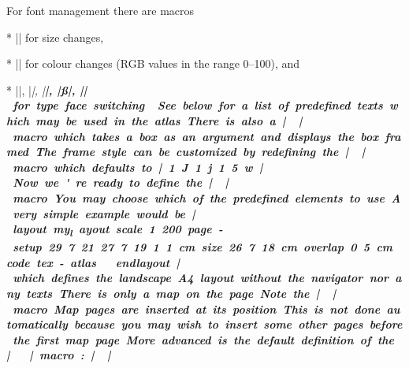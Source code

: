 For font management there are macros 

\list
* |\size[#1]| for size changes,

* |\color[#1 #2 #3]| for colour changes (RGB values in the range 0--100), and

* |\rm|, |\it|, |\bf|, |\ss|, |\si| for type face switching.
\endlist


See below for a list of predefined texts which may be used in the atlas.

There is also a |\framed| macro which takes a box as an argument and displays the 
box framed. The frame style can be customized by redefining the |\linestyle| 
macro which defaults to |1 J 1 j 1.5 w|.


Now we're ready to define the |\dopage| macro. You may choose which of the 
predefined elements to use. A very simple example would be

|layout my_layout
  scale 1 200
  page-setup 29.7 21 27.7 19 1 1 cm
  size 26.7 18 cm
  overlap 0.5 cm
  code tex-atlas
    \def\dopage{\box\mapbox}
    \insertmaps 
endlayout|

which defines the landscape A4 layout without the navigator nor any texts. There 
is only a map on the page.

Note the |\insertmaps| macro. Map pages are inserted at its position. 
This is not done automatically because you may wish to insert some other pages 
before the first map page. 

More advanced is the default definition of the |\dopage| macro:

|\def\dopage{%
 \vbox{\centerline{\framed{\mapbox}}
  \bigskip
  \line{%
    \vbox to \ht\navbox{
      \hbox{\size[20]\the\pagelabel
        \ifpagenumbering\space(\the\pagenum)\fi
        \space\size[16]\the\pagename}
      \ifpagenumbering
        \medskip
        \hbox{\qquad\qquad
          \vtop{%
            \hbox to 0pt{\hss\showpointer\pointerN\hss}
            \hbox to 0pt{\llap{\showpointer\pointerW\hskip0.7em}%
              \raise1pt\hbox to 0pt{\hss$\updownarrow$\hss}%
              \raise1pt\hbox to 0pt{\hss$\leftrightarrow$\hss}%
              \rlap{\hskip0.7em\showpointer\pointerE}}
              \hbox to 0pt{\hss\showpointer\pointerS\hss}
          }\qquad\qquad
          \vtop{
            \def\arr{$\uparrow$}
            \showpointerlist\pointerU
            \def\arr{$\downarrow$}
            \showpointerlist\pointerD
          }
        }
      \fi
      \vss
      \scalebar
    }\hss
    \box\navbox
  }
 }
}|

